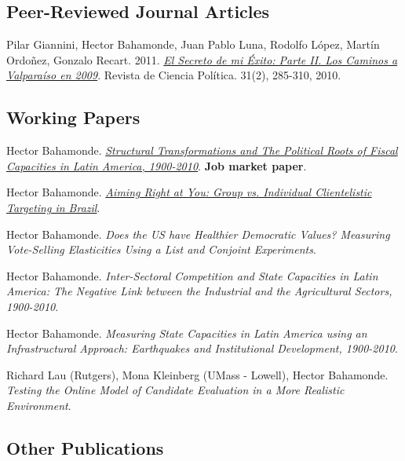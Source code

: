 \documentclass[letterpaper]{article}
\renewenvironment{itemize}{
  \begin{list}{}{
    \setlength{\leftmargin}{1.5em}
  }
}{
  \end{list}
}
\begin{document}
\subsection*{Peer-Reviewed Journal Articles}

\begin{itemize}
\item Pilar Giannini, Hector Bahamonde, Juan Pablo Luna, Rodolfo L\'opez, Mart\'in Ordo\~nez, Gonzalo Recart. 2011. \href{http://www.revistacienciapolitica.cl/rcp/wp-content/uploads/2013/09/07_vol_31_2.pdf}{\emph{El Secreto de mi \'Exito: Parte II. Los Caminos a Valpara\'iso en 2009}}. Revista de Ciencia Pol\'itica. 31(2), 285-310, 2010.
\end{itemize}



\subsection*{Working Papers}

\begin{itemize}
\item Hector Bahamonde. \href{https://github.com/hbahamonde/IncomeTaxAdoption/raw/Summer_2016/Bahamonde_IncomeTaxAdoption.pdf}{\emph{Structural Transformations and The Political Roots of Fiscal Capacities in Latin America, 1900-2010}}. {\bf Job market paper}.
\item Hector Bahamonde. \href{https://github.com/hbahamonde/Clientelism_paper/raw/LARR_Revisions/Bahamonde_Clientelism_Paper.pdf}{\emph{Aiming Right at You: Group vs. Individual Clientelistic Targeting in Brazil}}.
\item Hector Bahamonde. \emph{Does the US have Healthier Democratic Values? Measuring Vote-Selling Elasticities Using a List and Conjoint Experiments}.
\item Hector Bahamonde. \emph{Inter-Sectoral Competition and State Capacities in Latin America: The Negative Link between the Industrial and the Agricultural Sectors, 1900-2010}.
\item Hector Bahamonde. \emph{Measuring State Capacities in Latin America using an Infrastructural Approach: Earthquakes and Institutional Development, 1900-2010}.
\item Richard Lau (Rutgers), Mona Kleinberg (UMass - Lowell), Hector Bahamonde. \emph{Testing the Online Model of Candidate Evaluation in a More Realistic Environment}.
\end{itemize}

\subsection*{Other Publications}
\end{document}
